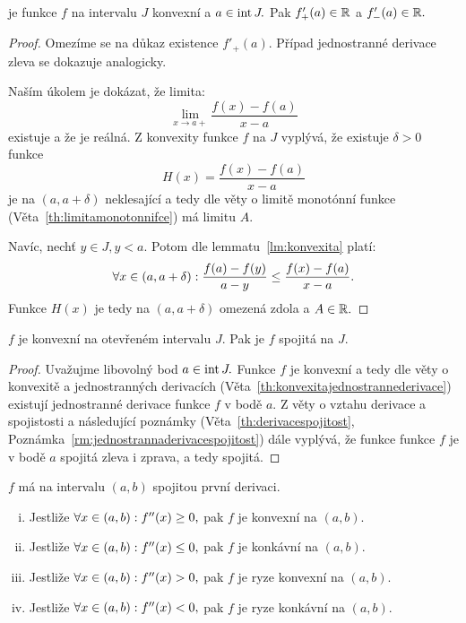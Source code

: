 \begin{theorem}
    \label{th:konvexitajednostrannederivace}
    \Necht je funkce $f$ na intervalu $J$ konvexní a $a \in \operatorname{int} J.$
    Pak $f'_+(a) \in \mathbb{R}$ a $f'_-(a) \in \mathbb{R}.$
\end{theorem}

\begin{proof}
    Omezíme se na důkaz existence $f'_+(a).$ Případ jednostranné derivace zleva
    se dokazuje analogicky.

    Naším úkolem je dokázat, že limita:
    $$\lim_{x \to a+} \frac{f(x) - f(a)}{x-a}$$
    existuje a že je reálná. Z konvexity funkce $f$ na $J$ vyplývá, že
    existuje $\delta > 0$ \tz funkce 
    $$H(x) = \frac{f(x) - f(a)}{x-a}$$
    je na $(a, a+\delta)$ neklesající a tedy dle věty o limitě monotónní funkce
    (Věta~\ref{th:limitamonotonnifce}) má limitu $A$.

    Navíc, nechť $y \in J, y<a.$ Potom dle lemmatu~\ref{lm:konvexita} platí:
    $$\forall x \in (a, a+\delta): \frac{f(a) - f(y)}{a-y} \leq \frac{f(x) - f(a)}{x-a}.$$
    Funkce $H(x)$ je tedy na $(a, a+\delta)$ omezená zdola a $A \in \mathbb{R}.$
\end{proof}

\begin{theorem}
    \Necht $f$ je konvexní na otevřeném intervalu $J.$ Pak je $f$ spojitá na $J.$
\end{theorem}

\begin{proof}
    Uvažujme libovolný bod $a \in \operatorname{int} J.$ Funkce $f$ je konvexní a tedy 
    dle věty o konvexitě a jednostranných derivacích 
    (Věta~\ref{th:konvexitajednostrannederivace}) existují jednostranné
    derivace funkce $f$ v bodě $a.$ Z věty o vztahu derivace a 
    spojistosti a následující poznámky (Věta~\ref{th:derivacespojitost}, 
    Poznámka~\ref{rm:jednostrannaderivacespojitost}) dále vyplývá, že funkce 
    funkce $f$ je v bodě $a$ spojitá zleva i zprava, a tedy spojitá.
\end{proof}

\begin{theorem}
    \Necht $f$ má na intervalu $(a,b)$ spojitou první derivaci.
    \begin{enumerate}[(i)]
        \item Jestliže $\forall x \in (a,b): f''(x) \geq 0,$ pak $f$ je konvexní na $(a,b).$
        \item Jestliže $\forall x \in (a,b): f''(x) \leq 0,$ pak $f$ je konkávní na $(a,b).$
        \item Jestliže $\forall x \in (a,b): f''(x) > 0,$ pak $f$ je ryze konvexní na $(a,b).$
        \item Jestliže $\forall x \in (a,b): f''(x) < 0,$ pak $f$ je ryze konkávní na $(a,b).$
    \end{enumerate}
\end{theorem}

